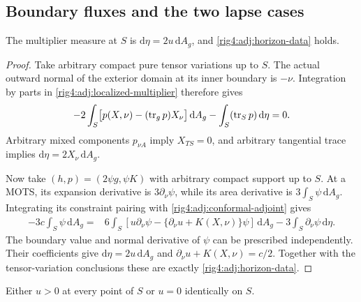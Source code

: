 \subsection{Boundary fluxes and the two lapse cases}

\begin{lemma}
\label{rig4:adj:boundary-data}
The multiplier measure at $S$ is $\mathrm d\eta=2u\,\mathrm dA_g$, and
\eqref{rig4:adj:horizon-data} holds.
\end{lemma}

\begin{proof}
Take arbitrary compact pure tensor variations up to $S$.  The actual outward
normal of the exterior domain at its inner boundary is $-\nu$.  Integration
by parts in \eqref{rig4:adj:localized-multiplier} therefore gives
\[
 -2\int_S\bigl[p(X,\nu)-(\operatorname{tr}_gp)X_\nu\bigr]\,\mathrm dA_g
      -\int_S(\operatorname{tr}_Sp)\,\mathrm d\eta=0.
\]
Arbitrary mixed components $p_{\nu A}$ imply $X_{TS}=0$, and arbitrary
tangential trace implies $\mathrm d\eta=2X_\nu\,\mathrm dA_g$.

Now take $(h,p)=(2\psi g,\psi K)$ with arbitrary compact support up to $S$.
At a MOTS, its expansion derivative is $3\partial_\nu\psi$, while its area
derivative is $3\int_S\psi\,\mathrm dA_g$.  Integrating its constraint
pairing with \eqref{rig4:adj:conformal-adjoint} gives
\begin{align*}
 -3c\int_S\psi\,\mathrm dA_g
 ={}&6\int_S\left[u\partial_\nu\psi
       -\{\partial_\nu u+K(X,\nu)\}\psi\right]\,\mathrm dA_g
       -3\int_S\partial_\nu\psi\,\mathrm d\eta.
\end{align*}
The boundary value and normal derivative of $\psi$ can be prescribed
independently.  Their coefficients give $\mathrm d\eta=2u\,\mathrm dA_g$
and $\partial_\nu u+K(X,\nu)=c/2$.  Together with the tensor-variation
conclusions these are exactly \eqref{rig4:adj:horizon-data}.
\end{proof}

\begin{lemma}
\label{rig4:adj:lapse-dichotomy}
Either $u>0$ at every point of $S$ or $u=0$ identically on $S$.
\end{lemma}

